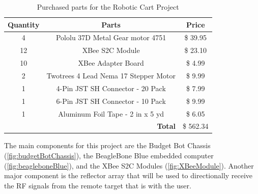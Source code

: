 \begin{table}[h!]
  \centering
  \begin{tabular}{c|c|c}
    \toprule
    \textbf{Quantity} & \textbf{Parts} & \textbf{Price}\\
    \toprule
    4 & Pololu 37D Metal Gear motor 4751 & \$ 39.95\\
    12 & XBee S2C Module & \$ 23.10\\
    10 & XBee Adapter Board & \$ 4.99\\
    2 & Twotrees 4 Lead Nema 17 Stepper Motor & \$ 9.99\\
    1 & 4-Pin JST SH Connector - 20 Pack & \$ 7.99\\
    1 & 6-Pin JST SH Connector - 10 Pack & \$ 9.99\\
    1 & Aluminum Foil Tape - 2 in x 5 yd & \$ 6.05\\
    \bottomrule
    \multicolumn{2}{r|}{\textbf{Total}} & \$ 562.34\\
    \bottomrule
  \end{tabular}
  \caption{Purchased parts for the Robotic Cart Project}
  \label{tab:Partslist}
\end{table}

\vspace*{12pt}
\noindent
The main components for this project are the Budget Bot Chassis (\autoref{fig:budgetBotChassis}), the BeagleBone Blue embedded computer (\autoref{fig:beagleboneBlue}), and the XBee S2C Modules (\autoref{fig:XBeeModule}). Another major component is the reflector array that will be used to directionally receive the RF signals from the remote target that is with the user.

